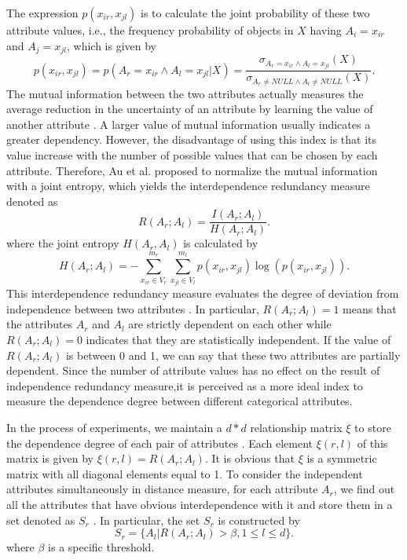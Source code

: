 \documentclass[review]{elsarticle}
\begin{document}
The expression $p(x_{ir},x_{jl})$ is to calculate the joint probability of these two attribute values, i.e., the frequency probability of objects in $X$ having $A_i = x_{ir}$ and $A_j = x_{jl}$, which is given by
\begin{equation}
p(x_{ir},x_{jl}) = p(A_r = x_{ir} \wedge A_l = x_{jl}|X) = \frac{\sigma_{A_r = x_{ir} \wedge A_l = x_{jl}}(X)}{\sigma_{A_r \neq NULL \wedge A_l \neq NULL}(X)}.
\label{equ11}
\end{equation}
The mutual information between the two attributes actually measures the average reduction in the uncertainty of an attribute by learning the value of another attribute \cite{MacKay2003Information}. A larger value of mutual information usually indicates a greater dependency. However, the disadvantage of using this index is that its value increase with the number of possible values that can be chosen by each attribute. Therefore, Au et al. \cite{Au2005Attribute} proposed to normalize the mutual information with a joint entropy, which yields the interdependence redundancy measure denoted as
\begin{equation}
R(A_r;A_l) = \frac{I(A_r;A_l)}{H(A_r;A_l)}.
\label{equ12}
\end{equation}
where the joint entropy $H(A_r,A_l)$ is calculated by
\begin{equation}
H(A_r;A_l) = - \sum_{x_{ir} \in V_r}^{m_r}\sum_{x_{jl} \in V_l}^{m_l}p(x_{ir},x_{jl})\log(p(x_{ir},x_{jl})).
\label{equ13}
\end{equation}
This interdependence redundancy measure evaluates the degree of deviation from independence between two attributes \cite{Au2005Attribute}. In particular, $R(A_r;A_l) = 1$ means that the attributes $A_r$ and $A_l$ are strictly dependent on each other while $R(A_r;A_l) = 0$ indicates that they are statistically independent. If the value of $R(A_r;A_l)$ is between 0 and 1, we can say that these two attributes are partially dependent. Since the number of attribute values has no effect on the result of independence redundancy measure,it is perceived as a more ideal index to measure the dependence degree between different categorical attributes.

In the process of experiments, we maintain a $d*d$ relationship matrix $\xi$ to store the dependence degree of each pair of attributes \cite{Jia2014A}. Each element $\xi(r,l)$ of this matrix is given by $\xi(r,l) = R(A_r;A_l)$. It is obvious that $\xi$ is a symmetric matrix with all diagonal elements equal to 1. To consider the independent attributes simultaneously in distance measure, for each attribute $A_r$, we find out all the attributes that have obvious interdependence with it and store them in a set denoted as $S_r$ \cite{Jia2014A}. In particular, the set $S_r$ is constructed by
\begin{equation}
S_r = \{A_l|R(A_r;A_l) > \beta, 1 \leq l \leq d \}.
\label{equ14}
\end{equation}
where $\beta$ is a specific threshold.
\end{document}
